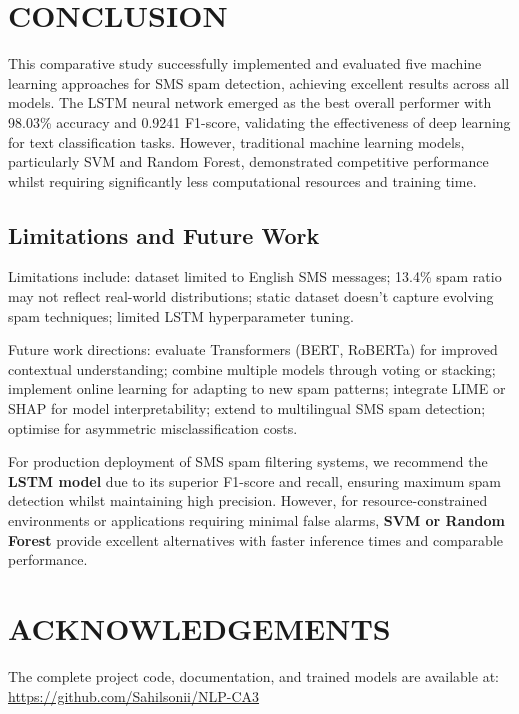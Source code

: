 \documentclass[a4paper,
               ]{jacow}
\begin{document}
\section{CONCLUSION}

This comparative study successfully implemented and evaluated five machine learning approaches for SMS spam detection, achieving excellent results across all models. The LSTM neural network emerged as the best overall performer with 98.03\% accuracy and 0.9241 F1-score, validating the effectiveness of deep learning for text classification tasks. However, traditional machine learning models, particularly SVM and Random Forest, demonstrated competitive performance whilst requiring significantly less computational resources and training time.

\subsection{Limitations and Future Work}

Limitations include: dataset limited to English SMS messages; 13.4\% spam ratio may not reflect real-world distributions; static dataset doesn't capture evolving spam techniques; limited LSTM hyperparameter tuning.

Future work directions: evaluate Transformers (BERT, RoBERTa) for improved contextual understanding; combine multiple models through voting or stacking; implement online learning for adapting to new spam patterns; integrate LIME or SHAP for model interpretability; extend to multilingual SMS spam detection; optimise for asymmetric misclassification costs.

For production deployment of SMS spam filtering systems, we recommend the \textbf{LSTM model} due to its superior F1-score and recall, ensuring maximum spam detection whilst maintaining high precision. However, for resource-constrained environments or applications requiring minimal false alarms, \textbf{SVM or Random Forest} provide excellent alternatives with faster inference times and comparable performance.

\section*{ACKNOWLEDGEMENTS}

The complete project code, documentation, and trained models are available at: \url{https://github.com/Sahilsonii/NLP-CA3}
\end{document}
